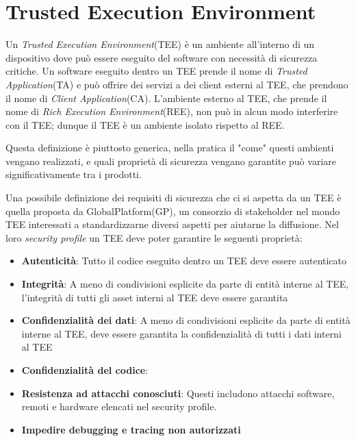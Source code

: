 \documentclass[12pt,italian]{report}
\begin{document}
\chapter{Trusted Execution Environment}
\label{sec:tee}
Un \textit{Trusted Execution Environment}(TEE) è un ambiente all'interno di
un dispositivo dove può essere eseguito del software con necessità di sicurezza
critiche.
Un software eseguito dentro un TEE prende il nome di
\textit{Trusted Application}(TA) e può offrire dei servizi a dei client
esterni al TEE, che prendono il nome di \textit{Client Application}(CA).
L'ambiente esterno al TEE, che prende il nome di
\textit{Rich Execution Environment}(REE), non può in alcun modo interferire
con il TEE; dunque il TEE è un ambiente isolato rispetto al REE.

Questa definizione è piuttosto generica, nella pratica il "come" questi
ambienti vengano realizzati, e quali proprietà di sicurezza vengano garantite
può variare significativamente tra i prodotti.

Una possibile definizione dei requisiti di sicurezza che ci si aspetta da un
TEE è quella proposta da GlobalPlatform(GP), un consorzio di stakeholder nel
mondo TEE interessati a standardizzarne diversi aspetti per aiutarne la
diffusione.
Nel loro \textit{security profile}\cite{gp2020securityprofile} un TEE deve
poter garantire le seguenti proprietà:

\begin{itemize}
	\item \textbf{Autenticità}: Tutto il codice eseguito dentro un TEE deve
	essere autenticato
	\item \textbf{Integrità}: A meno di condivisioni esplicite da parte di
	entità interne al TEE, l'integrità di tutti gli asset interni al TEE deve
	essere garantita
	\item \textbf{Confidenzialità dei dati}: A meno di condivisioni esplicite
	da parte di entità interne al TEE, deve essere garantita la confidenzialità
	di tutti i dati interni al TEE
	\item \textbf{Confidenzialità del codice}: 
	\item \textbf{Resistenza ad attacchi conosciuti}: Questi includono attacchi
	software, remoti e hardware elencati nel security profile.
	\item \textbf{Impedire debugging e tracing non autorizzati}
\end{itemize}
\end{document}
